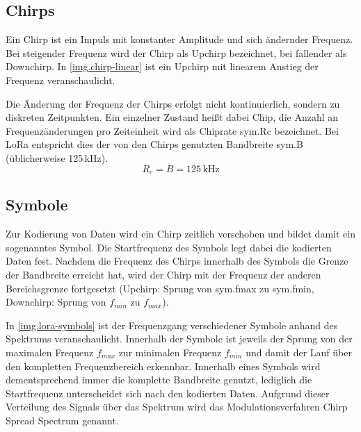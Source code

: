 \subsection{Chirps}\label{sec.lora.modulation.chirp}
Ein Chirp ist ein Impuls mit konstanter Amplitude und sich ändernder Frequenz.
Bei steigender Frequenz wird der Chirp als Upchirp bezeichnet, bei fallender als Downchirp.
In \autoref{img.chirp-linear} ist ein Upchirp mit linearem Anstieg der Frequenz veranschaulicht.

Die Änderung der Frequenz der Chirps erfolgt nicht kontinuierlich, sondern zu diskreten Zeitpunkten.
Ein einzelner Zustand heißt dabei Chip, die Anzahl an Frequenzänderungen pro Zeiteinheit wird als Chiprate \gls{sym.Rc} bezeichnet.
Bei LoRa entspricht dies der von den Chirps genutzten Bandbreite \gls{sym.B} (üblicherweise 125\,kHz).
\cite[S. 10]{loramodulation}
\begin{equation}
	R_c = B = 125\,\mathrm{kHz}
	\label{eq.chip-rate}
\end{equation}


\subsection{Symbole}
Zur Kodierung von Daten wird ein Chirp zeitlich verschoben und bildet damit ein sogenanntes Symbol.
Die Startfrequenz des Symbols legt dabei die kodierten Daten fest.
Nachdem die Frequenz des Chirps innerhalb des Symbols die Grenze der Bandbreite erreicht hat, wird der Chirp mit der Frequenz der anderen Bereichsgrenze fortgesetzt (Upchirp: Sprung von \gls{sym.fmax} zu \gls{sym.fmin}, Downchirp: Sprung von $f_{min}$ zu $f_{max}$).
\cite{lorachirps}

In \autoref{img.lora-symbols} ist der Frequenzgang verschiedener Symbole anhand des Spektrums veranschaulicht.
Innerhalb der Symbole ist jeweils der Sprung von der maximalen Frequenz $f_{max}$ zur minimalen Frequenz $f_{min}$ und damit der Lauf über den kompletten Frequenzbereich erkennbar.
Innerhalb eines Symbols wird dementsprechend immer die komplette Bandbreite genutzt, lediglich die Startfrequenz unterscheidet sich nach den kodierten Daten.
Aufgrund dieser Verteilung des Signals über das Spektrum wird das Modulationsverfahren Chirp Spread Spectrum genannt.

